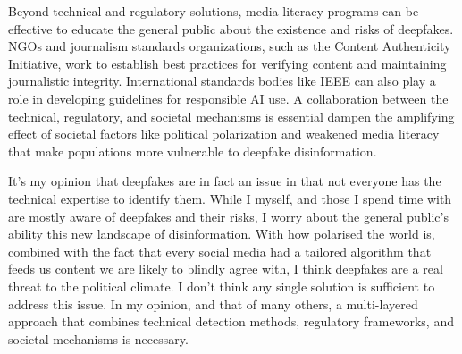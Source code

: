 Beyond technical and regulatory solutions, media literacy programs can be effective to educate the general public about the existence and risks of deepfakes. NGOs and journalism standards organizations, such as the Content Authenticity Initiative, work to establish best practices for verifying content and maintaining journalistic integrity. International standards bodies like IEEE can also play a role in developing guidelines for responsible AI use. A collaboration between the technical, regulatory, and societal mechanisms is essential dampen the amplifying effect of societal factors like political polarization and weakened media literacy that make populations more vulnerable to deepfake disinformation.


It's my opinion that deepfakes are in fact an issue in that not everyone has the technical expertise to identify them. While I myself, and those I spend time with are mostly aware of deepfakes and their risks, I worry about the general public's ability this new landscape of disinformation. With how polarised the world is, combined with the fact that every social media had a tailored algorithm that feeds us content we are likely to blindly agree with, I think deepfakes are a real threat to the political climate. I don't think any single solution is sufficient to address this issue. In my opinion, and that of many others, a multi-layered approach that combines technical detection methods, regulatory frameworks, and societal mechanisms is necessary.

